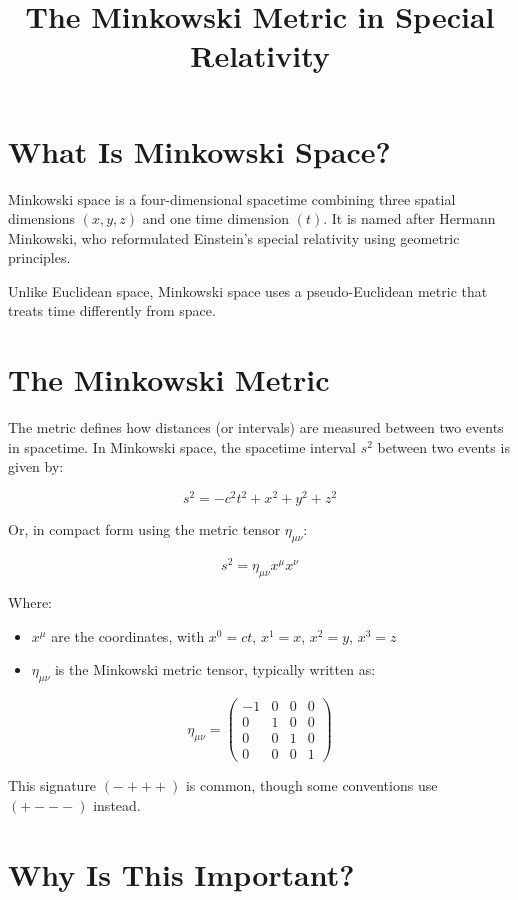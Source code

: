 \documentclass{article}
\title{The Minkowski Metric in Special Relativity}
\author{}
\date{}
\begin{document}
	
	\maketitle
	
	\section*{What Is Minkowski Space?}
	
	Minkowski space is a four-dimensional spacetime combining three spatial dimensions $(x, y, z)$ and one time dimension $(t)$. It is named after Hermann Minkowski, who reformulated Einstein’s special relativity using geometric principles.
	
	Unlike Euclidean space, Minkowski space uses a pseudo-Euclidean metric that treats time differently from space.
	
	\section*{The Minkowski Metric}
	
	The metric defines how distances (or intervals) are measured between two events in spacetime. In Minkowski space, the spacetime interval $s^2$ between two events is given by:
	
	\[
	s^2 = -c^2 t^2 + x^2 + y^2 + z^2
	\]
	
	Or, in compact form using the metric tensor $\eta_{\mu\nu}$:
	
	\[
	s^2 = \eta_{\mu\nu} x^\mu x^\nu
	\]
	
	Where:
	\begin{itemize}
		\item $x^\mu$ are the coordinates, with $x^0 = ct$, $x^1 = x$, $x^2 = y$, $x^3 = z$
		\item $\eta_{\mu\nu}$ is the Minkowski metric tensor, typically written as:
	\end{itemize}
	
	\[
	\eta_{\mu\nu} = \begin{pmatrix}
		-1 & 0 & 0 & 0 \\
		0 & 1 & 0 & 0 \\
		0 & 0 & 1 & 0 \\
		0 & 0 & 0 & 1
	\end{pmatrix}
	\]
	
	This signature $(-+++)$ is common, though some conventions use $(+---)$ instead.
	
	\section*{Why Is This Important?}
	
\end{document}
